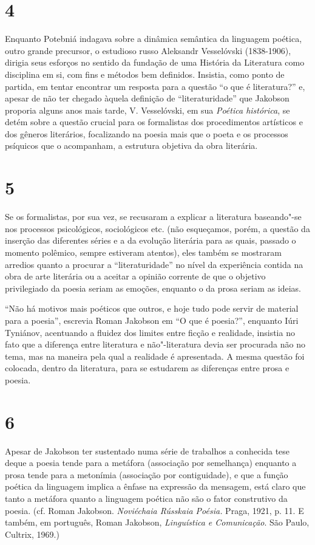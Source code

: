\section{4}

Enquanto Potebniá indagava sobre a dinâmica semântica da linguagem
poética, outro grande precursor, o estudioso russo Aleksandr Vesselóvski
(1838-1906), dirigia seus esforços no sentido da fundação de uma
História da Literatura como disciplina em si, com fins e métodos bem
definidos. Insistia, como ponto de partida, em tentar encontrar um
resposta para a questão ``o que é literatura?'' e, apesar de não ter
chegado àquela definição de ``literaturidade'' que Jakobson proporia alguns
anos mais tarde, V. Vesselóvski, em sua \emph{Poética histórica}, se
detém sobre a questão crucial para os formalistas dos procedimentos
artísticos e dos gêneros literários, focalizando na poesia mais que o
poeta e os processos psíquicos que o acompanham, a estrutura objetiva da obra literária.

\section{5}

Se os formalistas, por sua vez, se recusaram a explicar a literatura
baseando"-se nos processos psicológicos, sociológicos etc. (não
esqueçamos, porém, a questão da inserção das diferentes séries e a da
evolução literária para as quais, passado o momento polêmico, sempre
estiveram atentos), eles também se mostraram arredios quanto a procurar
a ``literaturidade'' no nível da experiência contida na obra de arte
literária ou a aceitar a opinião corrente de que o objetivo privilegiado
da poesia seriam as emoções, enquanto o da prosa seriam as ideias.

``Não há motivos mais poéticos que outros, e hoje tudo pode servir de
material para a poesia'', escrevia Roman Jakobson em ``O que é
poesia?'', enquanto Iúri Tyniánov, acentuando a fluidez dos limites
entre ficção e realidade, insistia no fato que a diferença entre
literatura e não"-literatura devia ser procurada não no tema, mas na
maneira pela qual a realidade é apresentada. A mesma questão foi
colocada, dentro da literatura, para se estudarem as diferenças entre
prosa e poesia.

\section{6}

Apesar de Jakobson ter sustentado numa série de trabalhos a conhecida
tese deque a poesia tende para a metáfora (associação por semelhança)
enquanto a prosa tende para a metonímia (associação por contiguidade), e
que a função poética da linguagem implica a ênfase na expressão da mensagem, está
claro que tanto a metáfora quanto a linguagem poética não são o fator
construtivo da poesia. (cf. Roman Jakobson. \emph{Noviéchaia Rússkaia
Poésia.} Praga, 1921, p. 11. E também, em português, Roman Jakobson,
\emph{Linguística e Comunicação}. São Paulo, Cultrix, 1969.)

